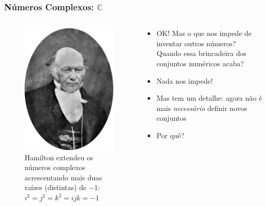 \documentclass[usenames,dvipsnames,svgnames]{beamer}
\begin{document}
\begin{frame}
	\frametitle{Números Complexos: $\mathbb{C}$}

	\begin{columns}[t]
	\begin{column}{.3\textwidth}
		\begin{figure}
			\includegraphics[width=0.9\linewidth]{pictures/Hamilton}
			\caption{\small Hamilton extendeu os números complexos acrescentando mais duas raízes (distintas) de $-1$: $i^2 = j^2 = k^2 = ijk = -1$}
		\end{figure}
	\end{column}
	\begin{column}{.7\textwidth}
		\small
		\begin{itemize}
		\item OK! Mas o que nos impede de inventar outros números? Quando essa brincadeira dos conjuntos numéricos acaba?
		\item Nada nos impede!
		\item Mas tem um detalhe: agora não é mais \emph{necessário} definir novos conjuntos
		\item Por quê?
		\end{itemize}
	\end{column}
	\end{columns}

\end{frame}
\end{document}
